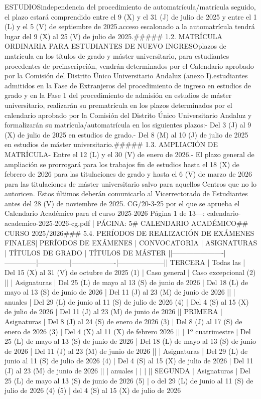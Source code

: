\documentclass{article}
\begin{document}
\begin{itemize}
{ESTUDIOS\n\nCon independencia del procedimiento de automatrícula/matrícula seguido, el plazo estará comprendido entre el 9 (X) y el 31 (J) de julio de 2025 y entre el 1 (L) y el 5 (V) de septiembre de 2025.\n\nEl acceso escalonado a la automatrícula tendrá lugar del 9 (X) al 25 (V) de julio de 2025.\n\n##### 1.2. MATRÍCULA ORDINARIA PARA ESTUDIANTES DE NUEVO INGRESO\n\nLos plazos de matrícula en los títulos de grado y máster universitario, para estudiantes procedentes de preinscripción, vendrán determinados por el Calendario aprobado por la Comisión del Distrito Único Universitario Andaluz (anexo I).\n\nLos estudiantes admitidos en la Fase de Extranjeros del procedimiento de ingreso en estudios de grado y en la Fase 1 del procedimiento de admisión en estudios de máster universitario, realizarán su prematrícula en los plazos determinados por el calendario aprobado por la Comisión del Distrito Único Universitario Andaluz y formalizarán su matrícula/automatrícula en los siguientes plazos:\n\n- Del 3 (J) al 9 (X) de julio de 2025 en estudios de grado.\n- Del 8 (M) al 10 (J) de julio de 2025 en estudios de máster universitario.\n\n##### 1.3. AMPLIACIÓN DE MATRÍCULA\n\n- Entre el 12 (L) y el 30 (V) de enero de 2026.\n- El plazo general de ampliación se prorrogará para los trabajos fin de estudios hasta el 18 (X) de febrero de 2026 para las titulaciones de grado y hasta el 6 (V) de marzo de 2026 para las titulaciones de máster universitario salvo para aquellos Centros que no lo autoricen. Estos últimos deberán comunicarlo al Vicerrectorado de Estudiantes antes del 28 (V) de noviembre de 2025.\n{} CG/20-3-25 por el que se aprueba el Calendario Académico para el curso 2025-2026  Página 1 de 13\n\n---\n\nFUENTE: calendario-academico-2025-2026-cg.pdf | PÁGINA: 5\n# CALENDARIO ACADÉMICO\n## CURSO 2025/2026\n\n### 5.4. PERÍODOS DE REALIZACIÓN DE EXÁMENES FINALES\n\n| PERÍODOS DE EXÁMENES | CONVOCATORIA | ASIGNATURAS | TÍTULOS DE GRADO | TÍTULOS DE MÁSTER |\n|----------------------|--------------|--------------|-------------------|--------------------|\n| TERCERA              | Todas las    | Del 15 (X) al 31 (V) de octubre de 2025 (1) | Caso general | Caso excepcional (2) |\n|                      | Asignaturas  | Del 25 (L) de mayo al 13 (S) de junio de 2026 | Del 18 (L) de mayo al 13 (S) de junio de 2026 | Del 11 (J) al 23 (M) de junio de 2026 |\n|                      | anuales      | Del 29 (L) de junio al 11 (S) de julio de 2026 (4) | Del 4 (S) al 15 (X) de julio de 2026 | Del 11 (J) al 23 (M) de junio de 2026 |\n| PRIMERA              | Asignaturas  | Del 8 (J) al 24 (S) de enero de 2026 (3) | Del 8 (J) al 17 (S) de enero de 2026 (3) | Del 4 (X) al 11 (X) de febrero 2026 |\n|                      | 1º cuatrimestre | Del 25 (L) de mayo al 13 (S) de junio de 2026 | Del 18 (L) de mayo al 13 (S) de junio de 2026 | Del 11 (J) al 23 (M) de junio de 2026 |\n|                      | Asignaturas  | Del 29 (L) de junio al 11 (S) de julio de 2026 (4) | Del 4 (S) al 15 (X) de julio de 2026 | Del 11 (J) al 23 (M) de junio de 2026 |\n|                      | anuales      | | | |\n| SEGUNDA              | Asignaturas  | Del 25 (L) de mayo al 13 (S) de junio de 2026 (5) | o del 29 (L) de junio al 11 (S) de julio de 2026 (4) (5) | del 4 (S) al 15 (X) de julio de 2026 }
\end{itemize}
\end{document}

